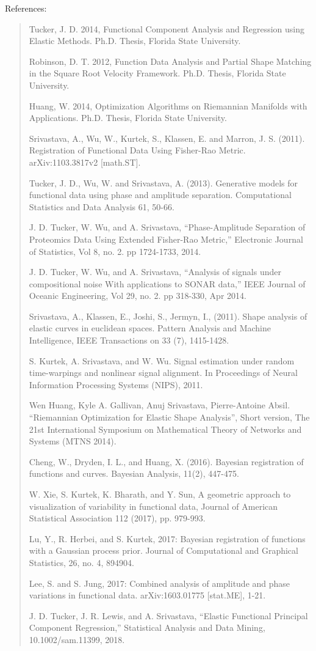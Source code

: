 \documentclass[letterpaper,10pt,english]{sphinxmanual}
\begin{document}
References:
\begin{quote}

Tucker, J. D. 2014, Functional Component Analysis and Regression using Elastic
Methods. Ph.D. Thesis, Florida State University.

Robinson, D. T. 2012, Function Data Analysis and Partial Shape Matching in the
Square Root Velocity Framework. Ph.D. Thesis, Florida State University.

Huang, W. 2014, Optimization Algorithms on Riemannian Manifolds with
Applications. Ph.D. Thesis, Florida State University.

Srivastava, A., Wu, W., Kurtek, S., Klassen, E. and Marron, J. S. (2011).
Registration of Functional Data Using Fisher-Rao Metric. arXiv:1103.3817v2
{[}math.ST{]}.

Tucker, J. D., Wu, W. and Srivastava, A. (2013). Generative models for
functional data using phase and amplitude separation. Computational Statistics
and Data Analysis 61, 50-66.

J. D. Tucker, W. Wu, and A. Srivastava, “Phase-Amplitude Separation of
Proteomics Data Using Extended Fisher-Rao Metric,” Electronic Journal of
Statistics, Vol 8, no. 2. pp 1724-1733, 2014.

J. D. Tucker, W. Wu, and A. Srivastava, “Analysis of signals under compositional
noise With applications to SONAR data,” IEEE Journal of Oceanic Engineering, Vol
29, no. 2. pp 318-330, Apr 2014.

Srivastava, A., Klassen, E., Joshi, S., Jermyn, I., (2011). Shape analysis of
elastic curves in euclidean spaces. Pattern Analysis and Machine Intelligence,
IEEE Transactions on 33 (7), 1415-1428.

S. Kurtek, A. Srivastava, and W. Wu. Signal estimation under random
time-warpings and nonlinear signal alignment. In Proceedings of Neural
Information Processing Systems (NIPS), 2011.

Wen Huang, Kyle A. Gallivan, Anuj Srivastava, Pierre-Antoine Absil. “Riemannian
Optimization for Elastic Shape Analysis”, Short version, The 21st International
Symposium on Mathematical Theory of Networks and Systems (MTNS 2014).

Cheng, W., Dryden, I. L., and Huang, X. (2016). Bayesian registration of functions
and curves. Bayesian Analysis, 11(2), 447-475.

W. Xie, S. Kurtek, K. Bharath, and Y. Sun, A geometric approach to visualization
of variability in functional data, Journal of American Statistical Association 112
(2017), pp. 979-993.

Lu, Y., R. Herbei, and S. Kurtek, 2017: Bayesian registration of functions with a Gaussian process prior. Journal of
Computational and Graphical Statistics, 26, no. 4, 894\textendash{}904.

Lee, S. and S. Jung, 2017: Combined analysis of amplitude and phase variations
in functional data. arXiv:1603.01775 {[}stat.ME{]}, 1-21.

J. D. Tucker, J. R. Lewis, and A. Srivastava, “Elastic Functional Principal
Component Regression,” Statistical Analysis and Data Mining, 10.1002/sam.11399, 2018.
\end{quote}
\end{document}
